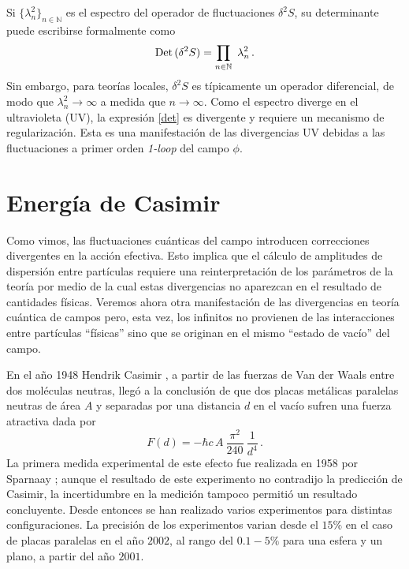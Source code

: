 Si $ \{ \lambda ^2 _n \} _{n \in \mathbb N}$ es el espectro del operador de fluctuaciones $ \delta ^2 S $, su determinante puede escribirse formalmente como
\begin{equation}\label{det}
{\rm Det}\,(\delta ^2 S) = \prod_{ n \in \mathbb N }\ \lambda ^2 _n\,.
\end{equation}
Sin embargo, para teorías locales, $\delta ^2 S$ es típicamente un operador diferencial, de modo que $\lambda ^2 _n\to\infty$ a medida que $n\to \infty$. Como el espectro diverge en el ultravioleta (UV), la expresión \eqref{det} es divergente y requiere un mecanismo de regularización. Esta es una manifestación de las divergencias UV debidas a las fluctuaciones a primer orden {\it 1-loop} del campo $\phi$.


\section{Energía de Casimir}\label{sec.casimir}

Como vimos, las fluctuaciones cuánticas del campo introducen correcciones divergentes en la acción efectiva. Esto implica que el cálculo de amplitudes de dispersión entre partículas requiere una reinterpretación de los parámetros de la teoría por medio de la cual estas divergencias no aparezcan en el resultado de cantidades físicas. Veremos ahora otra manifestación de las divergencias en teoría cuántica de campos pero, esta vez, los infinitos no provienen de las interacciones entre partículas ``físicas'' sino que se originan en el mismo ``estado de vacío'' del campo.


En el año 1948 Hendrik Casimir \cite{Casimir:1948dh}, a partir de las fuerzas de Van der Waals entre dos moléculas neutras, llegó a la conclusión de que dos placas metálicas paralelas neutras de área $A$ y separadas por una distancia $d$ en el vacío sufren una fuerza atractiva dada por
\begin{equation}
		F(d) = - \hbar c\,A\ \frac{\pi ^2 }{240}\ \frac{1}{d^4}\,.
	\label{casimir.1}
\end{equation}
La primera medida experimental de este efecto fue realizada en 1958 por Sparnaay \cite{SPARNAAY1958751}; aunque el resultado de este experimento no contradijo la predicción de Casimir, la incertidumbre en la medición tampoco permitió un resultado concluyente. Desde entonces se han realizado varios experimentos para distintas configuraciones. La precisión de los experimentos varian desde el $15 \%$ en el caso de placas paralelas \cite{casimir.placas.paralelas,articulo.casimir} en el año $2002$, al rango del $0.1-5 \%$ para una esfera y un plano, a partir del año $2001$\cite{casimir.cilindro1,PhysRevLett.81.4549,PhysRevD.60.111101,PhysRevA.62.052109}.

